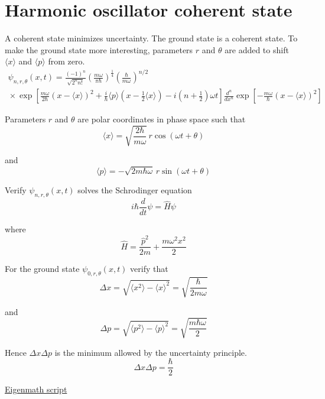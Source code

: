 

\section*{Harmonic oscillator coherent state}

A coherent state minimizes uncertainty.
The ground state is a coherent state.
To make the ground state more interesting, parameters $r$ and $\theta$ are added
to shift $\langle x\rangle$ and $\langle p\rangle$ from zero.
%
\begin{multline*}
\psi_{n,r,\theta}(x,t)
=\frac{(-1)^n}{\sqrt{2^nn!}}
\left(\frac{m\omega}{\pi\hbar}\right)^\frac{1}{4}
\left(\frac{\hbar}{m\omega}\right)^{n/2}
\\
{}\times
\exp\left[
\frac{m\omega}{2\hbar}\left(x-\langle x\rangle\right)^2
+\frac{i}{\hbar}\langle p\rangle\left(x-\tfrac{1}{2}\langle x\rangle\right)
-i\left(n+\tfrac{1}{2}\right)\omega t
\right]
\frac{d^n}{dx^n}\exp\left[-\frac{m\omega}{\hbar}\left(x-\langle x\rangle\right)^2\right]
\end{multline*}

Parameters $r$ and $\theta$ are polar coordinates in phase space such that
\begin{equation*}
\langle x\rangle=\sqrt{\frac{2\hbar}{m\omega}}\,r\cos(\omega t+\theta)
\end{equation*}

and
\begin{equation*}
\langle p\rangle=-\sqrt{2m\hbar\omega}\,r\sin(\omega t+\theta)
\end{equation*}

Verify $\psi_{n,r,\theta}(x,t)$ solves the Schrodinger equation
\begin{equation*}
i\hbar\frac{d}{dt}\psi=\hat H\psi
\end{equation*}

where
\begin{equation*}
\hat H=\frac{\hat p^2}{2m}+\frac{m\omega^2x^2}{2}
\end{equation*}

For the ground state $\psi_{0,r,\theta}(x,t)$ verify that
\begin{equation*}
\Delta x=\sqrt{\langle x^2\rangle-\langle x\rangle^2}
=\sqrt{\frac{\hbar}{2m\omega}}
\end{equation*}

and
\begin{equation*}
\Delta p=\sqrt{\langle p^2\rangle-\langle p\rangle^2}
=\sqrt{\frac{m\hbar\omega}{2}}
\end{equation*}

Hence $\Delta x\Delta p$ is the minimum allowed by the uncertainty principle.
\begin{equation*}
\Delta x\Delta p=\frac{\hbar}{2}
\end{equation*}

\href{https://georgeweigt.github.io/examples/harmonic-oscillator-coherent-state-demo.html}{Eigenmath script}


